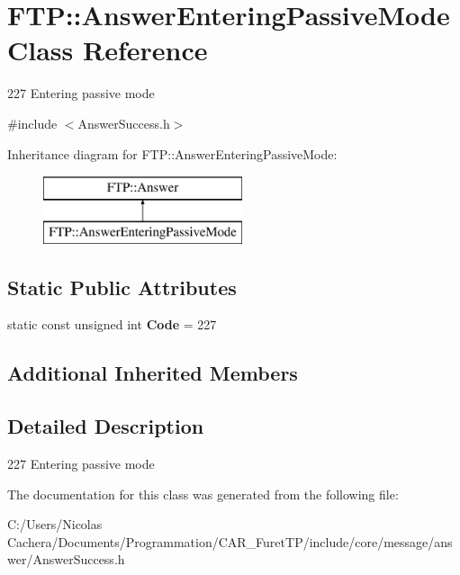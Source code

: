\hypertarget{classFTP_1_1AnswerEnteringPassiveMode}{}\section{F\+T\+P\+:\+:Answer\+Entering\+Passive\+Mode Class Reference}
\label{classFTP_1_1AnswerEnteringPassiveMode}


227 Entering passive mode  




{\ttfamily \#include $<$Answer\+Success.\+h$>$}

Inheritance diagram for F\+T\+P\+:\+:Answer\+Entering\+Passive\+Mode\+:\begin{figure}[H]
\begin{center}
\leavevmode
\includegraphics[height=2.000000cm]{classFTP_1_1AnswerEnteringPassiveMode}
\end{center}
\end{figure}
\subsection*{Static Public Attributes}
\begin{DoxyCompactItemize}
\item 
\hypertarget{classFTP_1_1AnswerEnteringPassiveMode_a3f6261b4cfda714e0611d9184e698c6d}{}static const unsigned int {\bfseries Code} = 227\label{classFTP_1_1AnswerEnteringPassiveMode_a3f6261b4cfda714e0611d9184e698c6d}

\end{DoxyCompactItemize}
\subsection*{Additional Inherited Members}


\subsection{Detailed Description}
227 Entering passive mode 

The documentation for this class was generated from the following file\+:\begin{DoxyCompactItemize}
\item 
C\+:/\+Users/\+Nicolas Cachera/\+Documents/\+Programmation/\+C\+A\+R\+\_\+\+Furet\+T\+P/include/core/message/answer/Answer\+Success.\+h\end{DoxyCompactItemize}

